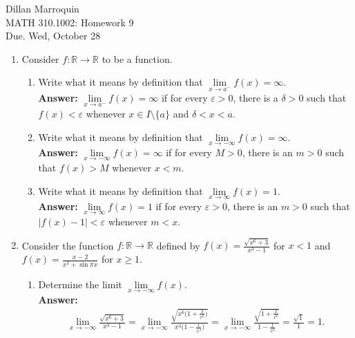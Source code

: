 \documentclass{article}
\begin{document}
    \noindent Dillan Marroquin\\ MATH 310.1002: Homework 9\\
    Due. Wed, October 28

    \begin{enumerate}
        \item Consider $f: \mathbb{R} \to \mathbb{R}$ to be a function.
        \begin{enumerate}
            \item Write what it means by definition that $\lim\limits _{x \to a^-} f(x) = \infty$.\\
            \textbf{Answer: }$\lim\limits_{x \to a^-} f(x) = \infty$ if for every $\varepsilon > 0$, there is a $\delta > 0$ such that $f(x) < \varepsilon$ whenever $x \in I \setminus \{a\}$ and $\delta < x < a$.\\
            
            \item Write what it means by definition that $\lim\limits _{x \to -\infty} f(x) = \infty$.\\
            \textbf{Answer: }$\lim\limits_{x \to -\infty} f(x) = \infty$ if for every $M > 0$, there is an $m > 0$ such that $f(x) > M$ whenever $x < m$.\\
            
            \item Write what it means by definition that $\lim\limits _{x \to \infty} f(x) = 1$.\\
            \textbf{Answer: }$\lim\limits_{x \to \infty} f(x) = 1$ if for every $\varepsilon > 0$, there is an $m > 0$ such that $|f(x)-1| < \varepsilon$ whenever $m < x$.\\
        \end{enumerate}
        
        \item Consider the function $f: \mathbb{R} \to \mathbb{R}$ defined by $f(x) =  \frac{\sqrt{x^6+3}}{x^3-1}$ for $x < 1$ and $f(x) = \frac{x-2}{x^3+\sin{\pi x}}$ for $x \geq 1$.
        \begin{enumerate}
            \item Determine the limit $\lim\limits_{x \to -\infty} f(x)$.\\
            \textbf{Answer: }
                \begin{align*}
                    \lim\limits_{x \to -\infty} \frac{\sqrt{x^6+3}}{x^3-1} = \lim\limits_{x \to -\infty} \frac{\sqrt{x^6\big(1+\frac{3}{x^6}\big)}}{x^3\big(1-\frac{1}{x^3}\big)} = \lim\limits_{x \to -\infty} \frac{\sqrt{1+\frac{3}{x^6}}}{1-\frac{1}{x^3}} = \frac{\sqrt{1}}{1} = 1.
                \end{align*}
            

\end{enumerate}
\end{enumerate}
\end{document}
